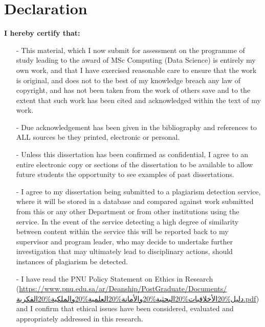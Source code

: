 \documentclass[12.5pt]{article}
\renewcommand{\normalsize}{\fontsize{13pt}{10.5}\selectfont}
\begin{document}
\begin{spacing}{-10}
    \normalsize
    \tableofcontents{}
\end{spacing}

\newpage

\section*{Declaration}

\noindent
\textbf{I hereby certify that:}

\begin{itemize}
\item[-] This material, which I now submit for assessment on the programme of study leading to the award of MSc Computing (Data Science) is entirely my own work, and that I have exercised reasonable care to ensure that the work is original, and does not to the best of my knowledge breach any law of copyright, and has not been taken from the work of others save and to the extent that such work has been cited and acknowledged within the text of my work.
\item[-] Due acknowledgement has been given in the bibliography and references to ALL sources be they printed, electronic or personal.
\item[-] Unless this dissertation has been confirmed as confidential, I agree to an entire electronic copy or sections of the dissertation to be available to allow future students the opportunity to see examples of past dissertations.
\item[-] I agree to my dissertation being submitted to a plagiarism detection service, where it will be stored in a database and compared against work submitted from this or any other Department or from other institutions using the service. In the event of the service detecting a high degree of similarity between content within the service this will be reported back to my supervisor and program leader, who may decide to undertake further investigation that may ultimately lead to disciplinary actions, should instances of plagiarism be detected.
\item[-] I have read the PNU Policy Statement on Ethics in Research (\url{https://www.pnu.edu.sa/ar/Deanship/PostGraduate/Documents/دليل%20الأخلاقيات%20البحثية%20والأمانة%20العلمية%20والملكية%20الفكرية.pdf}) and I confirm that ethical issues have been considered, evaluated and appropriately addressed in this research.
\end{itemize}
\end{document}
